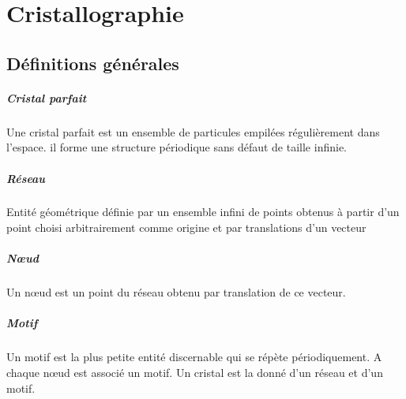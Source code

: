 \documentclass[french]{book}
\theoremstyle{plain}
\theoremstyle{definition}
\theoremstyle{remark}
\begin{document}
\section{}
\subsection{}
\subsection{}
\section{}
\subsection{}
\subsection{}

\chapter{Cristallographie}
\localtableofcontents
\section{Définitions générales}
\paragraph{Cristal parfait} Une cristal parfait est un ensemble de particules empilées régulièrement dans l'espace. il forme une structure périodique sans défaut de taille infinie.
\paragraph{Réseau} Entité géométrique définie par un ensemble infini de points obtenus à partir d'un point choisi arbitrairement comme origine et par translations d'un vecteur
\paragraph{Nœud} Un nœud est un point du réseau obtenu par translation de ce vecteur.
\paragraph{Motif} Un motif est la plus petite entité discernable qui se répète périodiquement. A chaque nœud est associé un motif. Un cristal est la donné d'un réseau et d'un motif.
\end{document}

